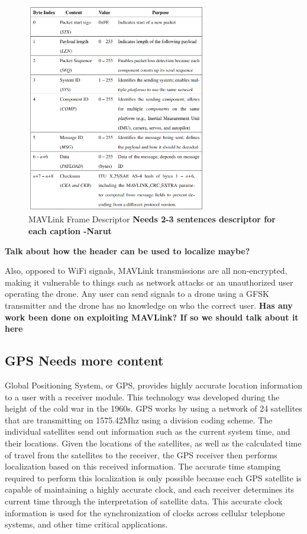 \begin{figure}[ht]
\centering
\includegraphics[width=0.70\textwidth]{img/MAVLink-Packet-Table.PNG}
\caption{MAVLink Frame Descriptor \textbf{Needs 2-3 sentences descriptor for each caption -Narut}}
\label{fig:MAVlink_frame_table}
\end{figure}
\textbf{Talk about how the header can be used to localize maybe?} 
\cite{mavlink_vuln}\par
Also, opposed to WiFi signals, MAVLink transmissions are all non-encrypted, making it vulnerable to things such as network attacks or an unauthorized user operating the drone. Any user can send signals to a drone using a GFSK transmitter and the drone has no knowledge on who the correct user\cite{MAVLink}. \textbf{Has any work been done on exploiting MAVLink? If so we should talk about it here}

\subsection{GPS \textbf{Needs more content}}
Global Positioning System, or GPS, provides highly accurate location information to a user with a receiver module. This technology was developed during the height of the cold war in the 1960s\cite{gps_info}. GPS works by using a network of 24 satellites that are transmitting on 1575.42Mhz using a division coding scheme. The individual satellites send out information such as the current system time, and their locations. Given the locations of the satellites, as well as the calculated time of travel from the satellites to the receiver, the GPS receiver then performs localization based on this received information. The accurate time stamping required to perform this localization is only possible because each GPS satellite is capable of maintaining a highly accurate clock, and each receiver determines its current time through the interpretation of satellite data. This accurate clock information is used for the synchronization of clocks across cellular telephone systems, and other time critical applications. \cite{GPS_Book}

